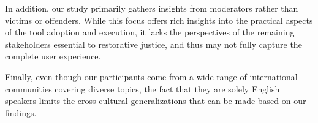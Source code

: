 
In addition, our study primarily gathers insights from moderators rather than victims or offenders. While this focus offers rich insights into the practical aspects of the tool adoption and execution, it lacks the perspectives of the remaining stakeholders essential to restorative justice, and thus may not fully capture the complete user experience.

Finally, even though our participants come from a wide range of international communities covering diverse topics, the fact that they are solely English speakers limits the cross-cultural generalizations that can be made based on our findings.
